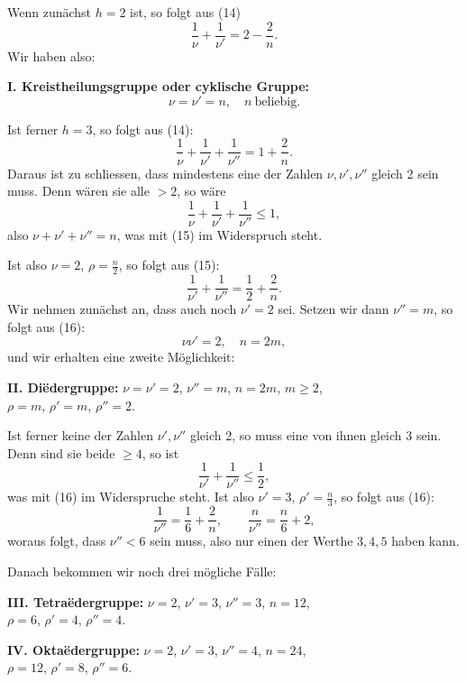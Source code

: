\documentclass[12pt,a4paper]{article}
\theoremstyle{plain}
\theoremstyle{definition}
\theoremstyle{remark}
\begin{document}
Wenn zun\"achst $h = 2$ ist, so folgt aus (14)
\[
\frac{1}{\nu} + \frac{1}{\nu'} = 2 - \frac{2}{n}.
\]
Wir haben also:

\textbf{I. Kreistheilungsgruppe oder cyklische Gruppe:}
\[
\nu = \nu' = n,\quad n\ \text{beliebig}.
\]

Ist ferner $h = 3$, so folgt aus (14):
\begin{equation}\label{eq:52_15}
\frac{1}{\nu} + \frac{1}{\nu'} + \frac{1}{\nu''} = 1 + \frac{2}{n}.\tag{15}
\end{equation}
Daraus ist zu schliessen, dass mindestens eine der Zahlen
$\nu, \nu', \nu''$ gleich 2 sein muss. Denn w\"aren sie alle $> 2$, so w\"are
\[
\frac{1}{\nu} + \frac{1}{\nu'} + \frac{1}{\nu''} \leq 1,
\]
also $\nu + \nu' + \nu'' = n$, was mit (15) im Widerspruch steht.

Ist also $\nu = 2$, $\rho = \tfrac{n}{2}$, so folgt aus (15):
\begin{equation}\label{eq:52_16}
\frac{1}{\nu'} + \frac{1}{\nu''} = \frac{1}{2} + \frac{2}{n}.\tag{16}
\end{equation}
Wir nehmen zun\"achst an, dass auch noch $\nu' = 2$ sei. Setzen
wir dann $\nu'' = m$, so folgt aus (16):
\[
\nu\nu' = 2,\quad n = 2m,
\]
und wir erhalten eine zweite M\"oglichkeit:

\textbf{II. Di\"edergruppe:} $\nu = \nu' = 2$, $\nu'' = m$, $n = 2m$, $m \geq 2$,\\
$\rho = m$, $\rho' = m$, $\rho'' = 2$.

Ist ferner keine der Zahlen $\nu', \nu''$ gleich 2, so muss eine von
ihnen gleich 3 sein. Denn sind sie beide $\geq 4$, so ist
\[
\frac{1}{\nu'} + \frac{1}{\nu''} \leq \frac{1}{2},
\]
was mit (16) im Widerspruche steht. Ist also $\nu' = 3$, $\rho' = \tfrac{n}{3}$,
so folgt aus (16):
\begin{equation}\label{eq:52_17}
\frac{1}{\nu''} = \frac{1}{6} + \frac{2}{n},\qquad \frac{n}{\nu''} = \frac{n}{6} + 2,\tag{17}
\end{equation}
woraus folgt, dass $\nu'' < 6$ sein muss, also nur einen der Werthe
$3, 4, 5$ haben kann.

Danach bekommen wir noch drei m\"ogliche F\"alle:

\textbf{III. Tetra\"edergruppe:} $\nu = 2$, $\nu' = 3$, $\nu'' = 3$, $n = 12$,\\
$\rho = 6$, $\rho' = 4$, $\rho'' = 4$.

\textbf{IV. Okta\"edergruppe:} $\nu = 2$, $\nu' = 3$, $\nu'' = 4$, $n = 24$,\\
$\rho = 12$, $\rho' = 8$, $\rho'' = 6$.
\end{document}
